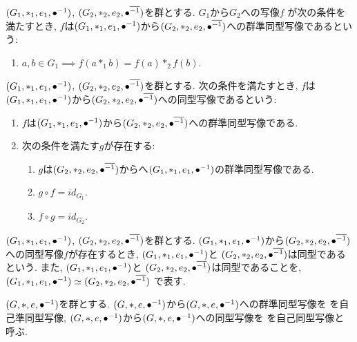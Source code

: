\begin{definition}
  $(G_1,\ast_1,e_1,{\bullet}^{-1})$,
  $(G_2,\ast_2,e_2,{\bullet}^{\overline{-1}})$を群とする.
  $G_1$から$G_2$への写像$f$
  が次の条件を満たすとき,
  $f$は$(G_1,\ast_1,e_1,{\bullet}^{-1})$から$(G_2,\ast_2,e_2,{\bullet}^{\overline{-1}})$への群準同型写像であるという:
  \begin{enumerate}
  \item $a,b\in G_1 \implies f(a\ast_1 b) = f(a)\ast_2 f(b)$.
  \end{enumerate}
\end{definition}

\begin{definition}
  $(G_1,\ast_1,e_1,{\bullet}^{-1})$,
  $(G_2,\ast_2,e_2,{\bullet}^{\overline{-1}})$を群とする.
  次の条件を満たすとき,
  $f$は$(G_1,\ast_1,e_1,{\bullet}^{-1})$から$(G_2,\ast_2,e_2,{\bullet}^{\overline{-1}})$への同型写像であるという:
  \begin{enumerate}
    \item $f$は$(G_1,\ast_1,e_1,{\bullet}^{-1})$から$(G_2,\ast_2,e_2,{\bullet}^{\overline{-1}})$への群準同型写像である.
    \item 次の条件を満たす$g$が存在する:
      \begin{enumerate}
      \item $g$は$(G_2,\ast_2,e_2,{\bullet}^{\overline{-1}})$からへ$(G_1,\ast_1,e_1,{\bullet}^{-1})$の群準同型写像である.
      \item $g\circ f = id_{G_1}$.
      \item $f\circ g = id_{G_2}$.
      \end{enumerate}
  \end{enumerate}
\end{definition}
\begin{definition}
  $(G_1,\ast_1,e_1,{\bullet}^{-1})$,
  $(G_2,\ast_2,e_2,{\bullet}^{\overline{-1}})$を群とする.
  $(G_1,\ast_1,e_1,{\bullet}^{-1})$から$(G_2,\ast_2,e_2,{\bullet}^{\overline{-1}})$への同型写像$f$が存在するとき,
  $(G_1,\ast_1,e_1,{\bullet}^{-1})$と
  $(G_2,\ast_2,e_2,{\bullet}^{\overline{-1}})$は同型であるという.
  また,
  $(G_1,\ast_1,e_1,{\bullet}^{-1})$と
  $(G_2,\ast_2,e_2,{\bullet}^{\overline{-1}})$は同型であることを,
  $(G_1,\ast_1,e_1,{\bullet}^{-1})\simeq(G_2,\ast_2,e_2,{\bullet}^{\overline{-1}})$
  で表す.
\end{definition}

\begin{remark}
  $(G,\ast,e,{\bullet}^{-1})$を群とする.
  $(G,\ast,e,{\bullet}^{-1})$から$(G,\ast,e,{\bullet}^{-1})$への群準同型写像を
  を自己準同型写像,
  $(G,\ast,e,{\bullet}^{-1})$から$(G,\ast,e,{\bullet}^{-1})$への同型写像を
  を自己同型写像と呼ぶ.
\end{remark}

